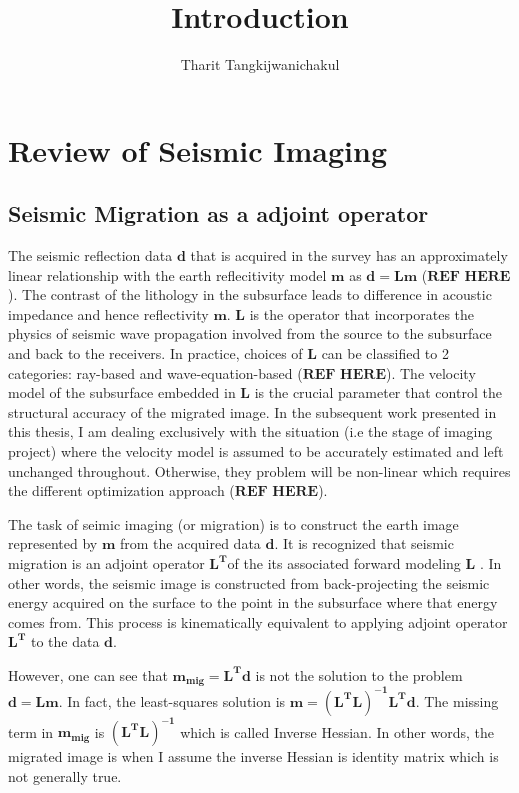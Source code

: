 \title{Introduction}
\author{Tharit Tangkijwanichakul}
\label{ch:chapter-intro}
\maketitle
{}


\section{Review of Seismic Imaging}

\subsection{Seismic Migration as a adjoint operator}

The seismic reflection data $\mathbf{d}$ that is acquired in the survey has an approximately linear relationship with the earth reflecitivity model $\mathbf{m}$ as $\mathbf{d=Lm}$ ($\textbf{REF HERE}$). The contrast of the lithology in the subsurface leads to difference in acoustic impedance and hence reflectivity $\mathbf{m}$. $\mathbf{L}$ is the operator that incorporates the physics of seismic wave propagation involved from the source to the subsurface and back to the receivers. In practice, choices of $\mathbf{L}$ can be classified to 2 categories: ray-based and wave-equation-based ($\textbf{REF HERE}$). The velocity model of the subsurface embedded in $\mathbf{L}$ is the crucial parameter that control the structural accuracy of the migrated image. In the subsequent work presented in this thesis, I am dealing exclusively with the situation (i.e the stage of imaging project) where the velocity model is assumed to be accurately estimated and left unchanged throughout. Otherwise, they problem will be non-linear which requires the different optimization approach ($\textbf{REF HERE}$).

The task of seimic imaging (or migration) is to construct the earth image represented by $\mathbf{m}$ from the acquired data $\mathbf{d}$. It is recognized that seismic migration is an adjoint operator $\mathbf{L^T}$of the its associated forward modeling $\mathbf{L}$ \cite[]{claerbout1992earth}. In other words, the seismic image is constructed from back-projecting the seismic energy acquired on the surface to the point in the subsurface where that energy comes from. This process is kinematically equivalent to applying adjoint operator $\mathbf{L^T}$ to the data $\mathbf{d}$.

However, one can see that $\mathbf{m_{mig} = L^{T}d}$ is not the solution to the problem $\mathbf{d=Lm}$. In fact, the least-squares solution is $\mathbf{m = (L^{T}L)^{-1} L^{T} d}$. The missing term in $\mathbf{m_{mig}}$ is $\mathbf{(L^{T}L)^{-1}}$ which is called Inverse Hessian. In other words, the migrated image is when I assume the inverse Hessian is identity matrix which is not generally true.


